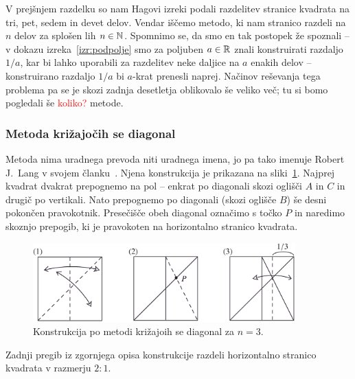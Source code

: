 V prejšnjem razdelku so nam Hagovi izreki podali razdelitev stranice kvadrata na tri, pet, sedem in devet delov. Vendar iščemo metodo, ki nam stranico razdeli na $n$ delov za splošen lih $n \in \mathbb N$. Spomnimo se, da smo en tak postopek že spoznali -- v dokazu izreka~\ref{izr:podpolje} smo za poljuben $a \in \mathbb R$ znali konstruirati razdaljo $1/a$, kar bi lahko uporabili za razdelitev neke daljice na $a$ enakih delov -- konstruirano razdaljo $1/a$ bi $a$-krat prenesli naprej. Načinov reševanja tega problema pa se je skozi zadnja desetletja oblikovalo še veliko več; tu si bomo pogledali še \textcolor{red}{koliko?} metode.

\subsubsection*{Metoda križajočih se diagonal}

Metoda nima uradnega prevoda niti uradnega imena, jo pa tako imenuje Robert J.\ Lang v svojem članku~\cite{lang1988}. Njena konstrukcija je prikazana na sliki~\ref{fig:kriz_diag_3}. Najprej kvadrat dvakrat prepognemo na pol -- enkrat po diagonali skozi oglišči $A$ in $C$ in drugič po vertikali. Nato prepognemo po diagonali (skozi oglišče $B$) še desni pokončen pravokotnik. Presečišče obeh diagonal označimo s točko $P$ in naredimo skoznjo prepogib, ki je pravokoten na horizontalno stranico kvadrata.

\begin{figure}[h]
    \centering
    \includegraphics[width=0.9\textwidth]{images/tretjinjenje_stranice1.png}
    \caption[Razdelitev stranice na tri dele]{Konstrukcija po metodi križajoih se diagonal za $n=3$.}
    \label{fig:kriz_diag_3}
\end{figure}

\begin{trditev}
    \label{trd:kriz_diag_3}
    Zadnji pregib iz zgornjega opisa konstrukcije razdeli horizontalno stranico kvadrata v razmerju $2:1$.
\end{trditev}

